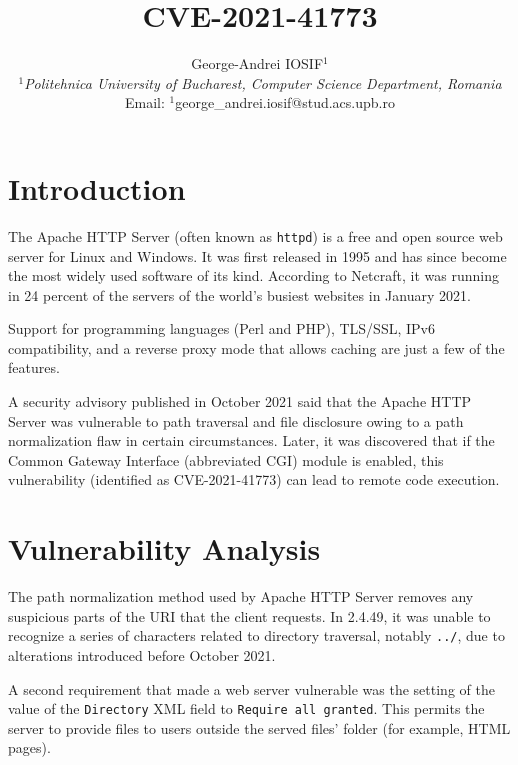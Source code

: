 \documentclass[12pt,a4paper,english,onecolumn]{IEEEtran}
\begin{document}
\title{CVE-2021-41773}

\author{George-Andrei IOSIF$^{1}$\\
$^{1}$\emph{Politehnica University of Bucharest, Computer Science Department, Romania}\\
Email: $^{1}$george\_andrei.iosif@stud.acs.upb.ro}

\maketitle

\section{Introduction}

The Apache HTTP Server (often known as \texttt{httpd}) is a free and open source web server for Linux and Windows. It was first released in 1995 and has since become the most widely used software of its kind. According to Netcraft, it was running in 24 percent of the servers of the world's busiest websites in January 2021.

Support for programming languages (Perl and PHP), TLS/SSL, IPv6 compatibility, and a reverse proxy mode that allows caching are just a few of the features.

A security advisory published in October 2021 said that the Apache HTTP Server was vulnerable to path traversal and file disclosure owing to a path normalization flaw in certain circumstances. Later, it was discovered that if the Common Gateway Interface (abbreviated CGI) module is enabled, this vulnerability (identified as CVE-2021-41773) can lead to remote code execution.

\section{Vulnerability Analysis}

The path normalization method used by Apache HTTP Server removes any suspicious parts of the URI that the client requests. In 2.4.49, it was unable to recognize a series of characters related to directory traversal, notably \texttt{../}, due to alterations introduced before October 2021.

A second requirement that made a web server vulnerable was the setting of the value of the \texttt{Directory} XML field to \texttt{Require all granted}. This permits the server to provide files to users outside the served files' folder (for example, HTML pages).
\end{document}
